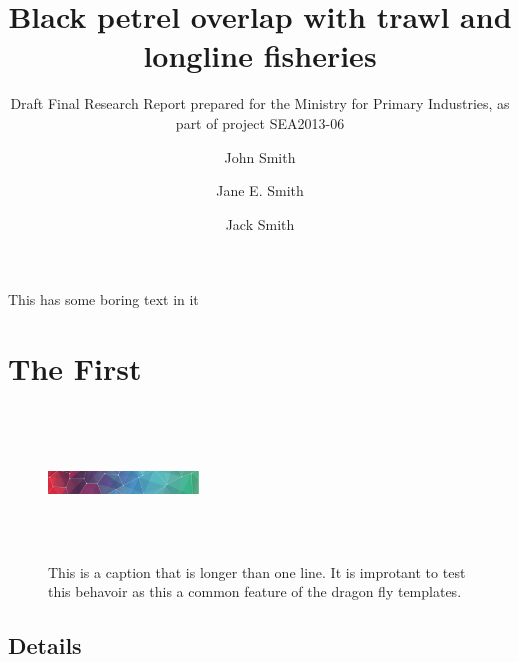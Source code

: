 \documentclass[draft]{dragonfly-report}
\title{Black petrel overlap with trawl and longline fisheries}{Overlap of the distribution of black petrel (\emph{Procellaria parkinsoni}) with  New Zealand trawl and longline fisheries}
\subtitle{Draft Final Research Report prepared for the Ministry for Primary Industries, as part of project SEA2013-06}
\author{John Smith \and Jane E. Smith \and Jack Smith}
\begin{document}
\maketitle

\tableofcontents

\summary%

This has some boring text in it

\section{The First}

\lipsum[1]


\begin{figure}[h]
  \includegraphics[width=40mm,height=40mm]{pattern}
  \caption{This is a caption that is longer than one line. It is improtant to test 
  this behavoir as this a common feature of the dragon fly templates.}
\end{figure}

\subsection{Details}

\lipsum[2]
\end{document}
